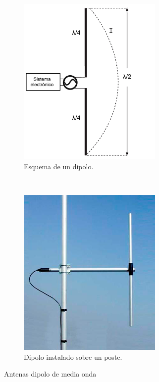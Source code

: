 \begin{figure}[h]
\centering
	\begin{subfigure}[b]{0.4\textwidth} %
		\centering
		\includegraphics[width=7cm]{archivos/dipolo/dipole1} %
		\caption{Esquema de un dipolo.}
		\label{fig:dipolo1}
	\end{subfigure}
~ %
	\begin{subfigure}[b]{0.4\textwidth} %
	\centering
		\includegraphics[width=7cm]{archivos/dipolo/dipole2} %
		\caption{Dipolo instalado sobre un poste. \cite{Sirio2012}}
		\label{fig:dipolo2}
	\end{subfigure}
\caption{Antenas dipolo de media onda}\label{fig:dipolo}
\end{figure}

